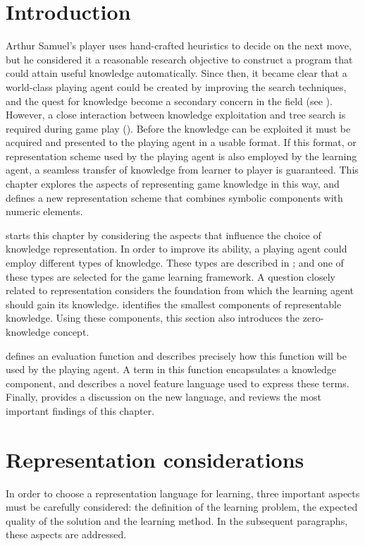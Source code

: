 \section{Introduction}
\label{sec:knowledge-intro}
Arthur Samuel's  player \cite{samuel:checkers} uses hand-crafted heuristics to decide on the next move, but he considered it a reasonable research objective to construct a program that could attain useful knowledge automatically.  Since then, it became clear that a world-class playing agent could be created by improving the search techniques, and the quest for knowledge become a secondary concern in the field (see ).  However, a close interaction between knowledge exploitation and tree search is required during game play ().  Before the knowledge can be exploited it must be acquired and presented to the playing agent in a usable format.  If this format, or representation scheme used by the playing agent is also employed by the learning agent, a seamless transfer of knowledge from learner to player is guaranteed.  This chapter explores the aspects of representing game knowledge in this way, and defines a new representation scheme that combines symbolic components with numeric elements.

 starts this chapter by considering the aspects that influence the choice of knowledge representation.  In order to improve its ability, a playing agent could employ different types of knowledge. These types are described in ; and one of these types are selected for the game learning framework.  A question closely related to representation considers the foundation from which the learning agent should gain its knowledge.  identifies the smallest components of representable knowledge. Using these components, this section also introduces the zero-knowledge concept.      

 defines an evaluation function and describes precisely how this function will be used by the playing agent. A term in this function encapsulates a knowledge component, and    describes a novel feature language used to express these terms.  Finally,  provides a discussion on the new language, and reviews the most important findings of this chapter.


\section{Representation considerations}
\label{sec:knowledge-representation}
In order to choose a representation language for learning, three important  aspects must be carefully considered: the definition of the learning problem, the expected quality of the solution and the learning method. In the subsequent paragraphs, these aspects are addressed.

